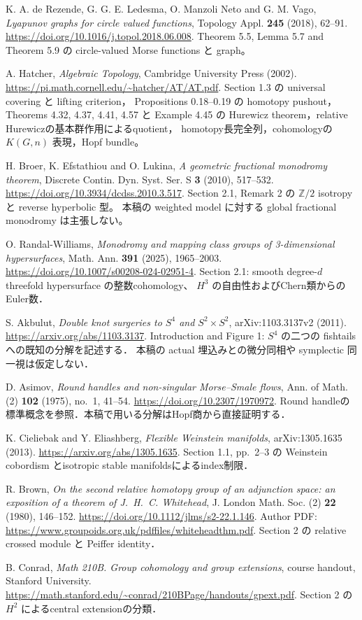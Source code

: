 K. A. de Rezende, G. G. E. Ledesma, O. Manzoli Neto and G. M. Vago,
\emph{Lyapunov graphs for circle valued functions},
Topology Appl. \textbf{245} (2018), 62--91.
\url{https://doi.org/10.1016/j.topol.2018.06.008}.
Theorem 5.5, Lemma 5.7 and Theorem 5.9 の circle-valued Morse functions と graph。

A. Hatcher,
\emph{Algebraic Topology}, Cambridge University Press (2002).
\url{https://pi.math.cornell.edu/~hatcher/AT/AT.pdf}.
Section 1.3 の universal covering と lifting criterion，
Propositions 0.18--0.19 の homotopy pushout，
Theorems 4.32, 4.37, 4.41, 4.57 と Example 4.45 の
Hurewicz theorem，relative Hurewiczの基本群作用によるquotient，
homotopy長完全列，cohomologyの $K(G,n)$ 表現，Hopf bundle。


H. Broer, K. Efstathiou and O. Lukina,
\emph{A geometric fractional monodromy theorem},
Discrete Contin. Dyn. Syst. Ser. S \textbf{3} (2010), 517--532.
\url{https://doi.org/10.3934/dcdss.2010.3.517}.
Section 2.1, Remark 2 の $\mathbb Z/2$ isotropy と reverse hyperbolic 型。
本稿の weighted model に対する global fractional monodromy は主張しない。


O. Randal-Williams,
\emph{Monodromy and mapping class groups of 3-dimensional hypersurfaces},
Math. Ann. \textbf{391} (2025), 1965--2003.
\url{https://doi.org/10.1007/s00208-024-02951-4}.
Section 2.1: smooth degree-$d$ threefold hypersurface の整数cohomology、
$H^3$ の自由性およびChern類からのEuler数．


S. Akbulut,
\emph{Double knot surgeries to $S^4$ and $S^2\times S^2$},
arXiv:1103.3137v2 (2011).
\url{https://arxiv.org/abs/1103.3137}.
Introduction and Figure 1: $S^4$ の二つの fishtails への既知の分解を記述する．
本稿の actual 埋込みとの微分同相や symplectic 同一視は仮定しない．

D. Asimov,
\emph{Round handles and non-singular Morse--Smale flows},
Ann. of Math. (2) \textbf{102} (1975), no.~1, 41--54.
\url{https://doi.org/10.2307/1970972}.
Round handleの標準概念を参照．本稿で用いる分解はHopf商から直接証明する．

K. Cieliebak and Y. Eliashberg,
\emph{Flexible Weinstein manifolds}, arXiv:1305.1635 (2013).
\url{https://arxiv.org/abs/1305.1635}.
Section 1.1, pp.~2--3 の Weinstein cobordism とisotropic stable manifoldsによるindex制限．

R. Brown,
\emph{On the second relative homotopy group of an adjunction space:
an exposition of a theorem of J.~H.~C. Whitehead},
J. London Math. Soc. (2) \textbf{22} (1980), 146--152.
\url{https://doi.org/10.1112/jlms/s2-22.1.146}.
Author PDF: \url{https://www.groupoids.org.uk/pdffiles/whiteheadthm.pdf}.
Section 2 の relative crossed module と Peiffer identity．

B. Conrad,
\emph{Math 210B. Group cohomology and group extensions},
course handout, Stanford University.
\url{https://math.stanford.edu/~conrad/210BPage/handouts/gpext.pdf}.
Section 2 の $H^2$ によるcentral extensionの分類．
